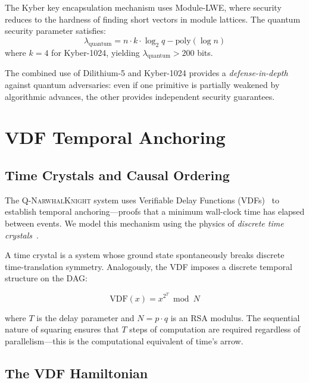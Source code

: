 \documentclass[12pt,a4paper,twocolumn]{article}
\newcommand{\qnk}{\textsc{Q-NarwhalKnight}}
\begin{document}
The Kyber key encapsulation mechanism uses Module-LWE, where security reduces to the hardness of finding short vectors in module lattices. The quantum security parameter satisfies:
\begin{equation}
\lambda_{\mathrm{quantum}} = n \cdot k \cdot \log_2 q - \mathrm{poly}(\log n)
\end{equation}
where $k = 4$ for Kyber-1024, yielding $\lambda_{\mathrm{quantum}} > 200$ bits.

The combined use of Dilithium-5 and Kyber-1024 provides a \emph{defense-in-depth} against quantum adversaries: even if one primitive is partially weakened by algorithmic advances, the other provides independent security guarantees.

\section{VDF Temporal Anchoring}
\label{sec:vdf}

\subsection{Time Crystals and Causal Ordering}

The \qnk{} system uses Verifiable Delay Functions (VDFs)~\cite{vdf} to establish temporal anchoring---proofs that a minimum wall-clock time has elapsed between events. We model this mechanism using the physics of \emph{discrete time crystals}~\cite{timecrystal}.

A time crystal is a system whose ground state spontaneously breaks discrete time-translation symmetry. Analogously, the VDF imposes a discrete temporal structure on the DAG:

\begin{equation}
\text{VDF}(x) = x^{2^T} \bmod N
\end{equation}

where $T$ is the delay parameter and $N = p \cdot q$ is an RSA modulus. The sequential nature of squaring ensures that $T$ steps of computation are required regardless of parallelism---this is the computational equivalent of time's arrow.

\subsection{The VDF Hamiltonian}
\end{document}
